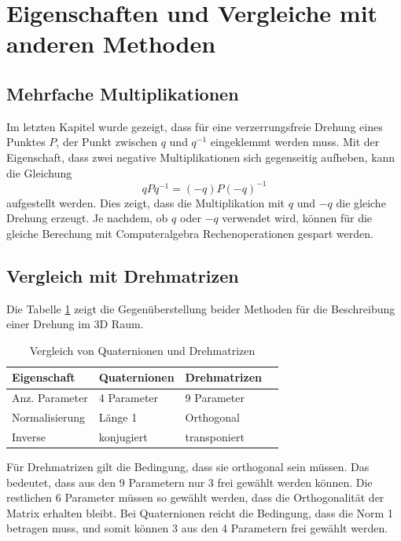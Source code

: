 %
%
%
%

\section{Eigenschaften und Vergleiche mit anderen Methoden\label{qa:section:eigenschaften}}
\subsection{Mehrfache Multiplikationen}
Im letzten Kapitel wurde gezeigt, dass für eine verzerrungsfreie 
Drehung eines Punktes $P$, der Punkt zwischen $q$ und $q^{-1}$ 
eingeklemmt werden muss. Mit der Eigenschaft, dass zwei negative 
Multiplikationen sich gegenseitig aufheben, kann die  
Gleichung
\begin{equation*}
    q P q^{-1} = (-q) P (-q)^{-1}
\end{equation*}
aufgestellt werden. Dies zeigt, dass die Multiplikation mit $q$ und 
$-q$ die gleiche Drehung erzeugt. Je nachdem, ob $q$ oder $-q$ 
verwendet wird, können für die gleiche Berechung mit 
Computeralgebra Rechenoperationen gespart werden.

\subsection{Vergleich mit Drehmatrizen}
Die Tabelle \ref{qa:tab:vergleich} zeigt die 
Gegenüberstellung beider Methoden für die Beschreibung einer 
Drehung im 3D Raum.
\begin{table}
        \centering
        \small
        \begin{tabular}{llll}
            \textbf{Eigenschaft} & \textbf{Quaternionen} & \textbf{Drehmatrizen}\\
            \hline
            Anz. Parameter & 4 Parameter & 9 Parameter  \\
            \hline
            Normalisierung & Länge 1 & Orthogonal   \\
            \hline
            Inverse & konjugiert & transponiert  \\
        \end{tabular}
        \caption{Vergleich von Quaternionen und Drehmatrizen}
        \label{qa:tab:vergleich}
\end{table}
Für Drehmatrizen gilt die Bedingung, dass sie orthogonal sein 
müssen. Das bedeutet, dass aus den 9 Parametern nur 3 frei gewählt 
werden können. Die restlichen 6 Parameter müssen so gewählt werden, 
dass die Orthogonalität der Matrix erhalten bleibt. Bei 
Quaternionen reicht die Bedingung, dass die Norm 1 betragen muss, 
und somit können 3 aus den 4 Parametern frei gewählt werden.

